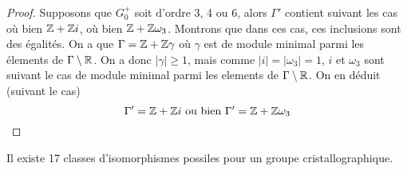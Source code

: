 \begin{proof}
	Supposons que $G_0^+$ soit d'ordre 3, 4 ou 6, alors $\Gamma'$
	contient suivant les cas où bien $\mathbb{Z} + \mathbb{Z} i$, où bien $\mathbb{Z} + \mathbb{Z}\omega_3$.
	Montrons que dans ces cas, ces inclusions sont des égalités.
	On a que $\Gamma = \mathbb{Z} + \mathbb{Z}\gamma$ où $\gamma$ est de module minimal parmi les
	élements de $\Gamma \setminus \mathbb{R}$. On a donc $|\gamma| \geq 1$, mais comme
	$|i| = |\omega_3| = 1$, $i$ et $\omega_3$ sont suivant le cas de module
	minimal parmi les elements de $\Gamma \setminus \mathbb{R}$.
	On en déduit (suivant le cas)
	\begin{equation*}
		\Gamma' = \mathbb{Z} + \mathbb{Z} i \textrm{ ou bien } \Gamma' = \mathbb{Z} + \mathbb{Z}\omega_3
	\end{equation*}



\end{proof}

\begin{theorem}
	Il existe 17 classes d'isomorphismes possiles pour un groupe
	cristallographique.
\end{theorem}


